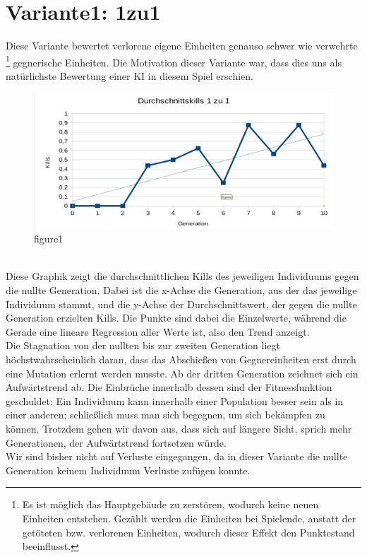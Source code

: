 \documentclass[
	12pt,
	a4paper,
	BCOR10mm,
	DIV14,
	headsepline,
	usegeometry,
]{scrreprt}
\begin{document}
\section{Variante1: 1zu1}
Diese Variante bewertet verlorene eigene Einheiten genauso schwer wie verwehrte \footnote{Es ist möglich das Hauptgebäude zu zerstören, wodurch keine neuen Einheiten entstehen. Gezählt werden die Einheiten bei Spielende, anstatt der getöteten bzw. verlorenen Einheiten, wodurch dieser Effekt den Punktestand beeinflusst.} gegnerische Einheiten. Die Motivation dieser Variante war, dass dies uns als natürlichste Bewertung einer KI in diesem Spiel erschien.
\begin{figure}[h]
	\includegraphics[width = \textwidth]{Durchschnittskills1zu1.png}
	\caption{figure1}
	\label{figure1}
\end{figure}\\
Diese Graphik zeigt die durchschnittlichen Kills des jeweiligen Individuums gegen die nullte Generation. Dabei ist die x-Achse die Generation, aus der das jeweilige Individuum stammt, und die y-Achse der Durchschnittswert, der gegen die nullte Generation erzielten Kills. Die Punkte sind dabei die Einzelwerte, während die Gerade eine lineare Regression aller Werte ist, also den Trend anzeigt.\\
Die Stagnation von der nullten bis zur zweiten Generation liegt höchstwahrscheinlich daran, dass das Abschießen von Gegnereinheiten erst durch eine Mutation erlernt werden musste. Ab der dritten Generation zeichnet sich ein Aufwärtstrend ab. Die Einbrüche innerhalb dessen sind der Fitnessfunktion geschuldet: Ein Individuum kann innerhalb einer Population besser sein als in einer anderen; schließlich muss man sich begegnen, um sich bekämpfen zu können. Trotzdem gehen wir davon aus, dass sich auf längere Sicht, sprich mehr Generationen, der Aufwärtstrend fortsetzen würde.\\
Wir sind bisher nicht auf Verluste eingegangen, da in dieser Variante die nullte Generation keinem Individuum Verluste zufügen konnte.
\end{document}
